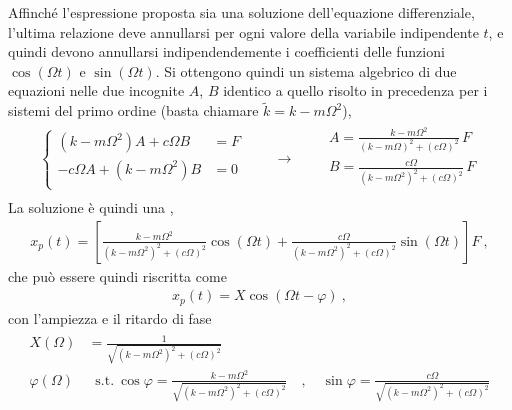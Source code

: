 \documentclass[letterpaper,10pt,italian]{jupyterBook}
\begin{document}
\sphinxAtStartPar
Affinché l’espressione proposta sia una soluzione dell’equazione differenziale, l’ultima relazione deve annullarsi per ogni valore della variabile indipendente \(t\), e quindi devono annullarsi indipendendemente i coefficienti delle funzioni \(\cos(\Omega t)\) e \(\sin (\Omega t)\). Si ottengono quindi un sistema algebrico di due equazioni nelle due incognite \(A\), \(B\) identico a quello risolto in precedenza per i sistemi del primo ordine (basta chiamare \(\tilde{k} = k - m \Omega^2\)),
\begin{equation*}
\begin{split}
\begin{cases}
  (k - m \Omega^2) A + c \Omega B & = F \\
 - c \Omega A + (k - m \Omega^2) B & = 0 \\
\end{cases}
\qquad \rightarrow \qquad
\begin{aligned}
  A = \frac{k - m \Omega^2}{(k-m\Omega)^2 + (c \Omega)^2} \, F \\
  B = \frac{c\Omega}{(k-m\Omega^2)^2 + (c \Omega)^2} \, F  \\
\end{aligned}
\end{split}
\end{equation*}
\sphinxAtStartPar
La soluzione è quindi una {\hyperref[\detokenize{ch/trigonometry:math-hs-trigonometry-linear-combination}]{}},
\begin{equation*}
\begin{split}x_p(t) = \left[  \frac{k-m\Omega^2}{(k-m\Omega^2)^2 + (c \Omega)^2} \cos(\Omega t) + \frac{c \Omega}{(k-m\Omega^2)^2 + (c \Omega)^2} \sin(\Omega t) \right] F \ ,\end{split}
\end{equation*}
\sphinxAtStartPar
che può essere quindi riscritta come
\begin{equation*}
\begin{split}x_p(t) = X \cos (\Omega t - \varphi) \ ,\end{split}
\end{equation*}
\sphinxAtStartPar
con l’ampiezza e il ritardo di fase
\begin{equation*}
\begin{split}\begin{aligned}
  X(\Omega) & = \frac{1}{\sqrt{(k-m\Omega^2)^2 + (c\Omega)^2}} \\
  \varphi(\Omega) & \ \text{ s.t.} \ \cos \varphi = \frac{k-m\Omega^2}{\sqrt{(k-m\Omega^2)^2 + (c\Omega)^2}} \quad , \quad \sin \varphi = \frac{c\Omega}{\sqrt{(k-m\Omega^2)^2 + (c\Omega)^2}}
\end{aligned}\end{split}
\end{equation*}
\end{document}
